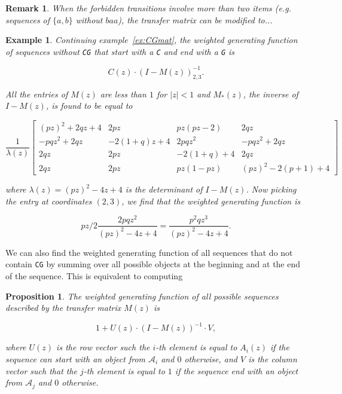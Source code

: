 \documentclass{article}
\newtheorem{example}{Example}
\newtheorem{proposition}{Proposition}
\newtheorem{remark}{Remark}
\begin{document}
\begin{remark}
When the forbidden transitions involve more than two items (\textit{e.g.}
sequences of $\{a,b\}$ without $baa$), the transfer matrix can be modified
to...
\end{remark}

\begin{example}
\label{ex:CGmat2}
Continuing example~\ref{ex:CGmat}, the weighted generating function of
sequences without \texttt{CG} that start with a \texttt{C} and end with a
\texttt{G} is

\begin{equation*}
C(z) \cdot (I-M(z))^{-1}_{2,3}.
\end{equation*}

All the entries of $M(z)$ are less than $1$ for $|z| < 1$ and $M_*(z)$,
the inverse of $I-M(z)$, is found to be equal to 

\begin{equation*}
\frac{1}{\lambda(z)} \left[
\begin{matrix}
(pz)^2+2qz+4   & 2pz        & pz(pz-2)   & 2qz                \\
-pqz^2+2qz     & -2(1+q)z+4 & 2pqz^2     & -pqz^2+2qz         \\
2qz            & 2pz        & -2(1+q)+4  & 2qz                \\
2qz            & 2pz        & pz(1-pz)   & (pz)^2 - 2(p+1) +4
\end{matrix}
\right]
\end{equation*}

\noindent
where $\lambda(z) = (pz)^2 - 4z + 4$ is the determinant of $I-M(z)$. Now
picking the entry at coordinates $(2,3)$, we find that the weighted
generating function is

\begin{equation*}
pz/2\frac{2pqz^2}{(pz)^2 - 4z + 4}
= \frac{p^2qz^3}{(pz)^2 - 4z + 4}.
\end{equation*}
\end{example}

We can also find the weighted generating function of all sequences that do
not contain \texttt{CG} by summing over all possible objects at the
beginning and at the end of the sequence. This is equivalent to computing

\begin{proposition}
\label{th:TM2WGF}
The weighted generating function of all possible sequences described by
the transfer matrix $M(z)$ is 

\begin{equation}
1 + U(z) \cdot (I-M(z))^{-1} \cdot V,
\end{equation}

\noindent
where $U(z)$ is the row vector such the $i$-th element is equal to
$A_i(z)$ if the sequence can start with an object from $\mathcal{A}_i$ and
$0$ otherwise, and $V$ is the column vector such that the $j$-th element
is equal to $1$ if the sequence end with an object from $\mathcal{A}_j$
and $0$ otherwise.
\end{proposition}
\end{document}

